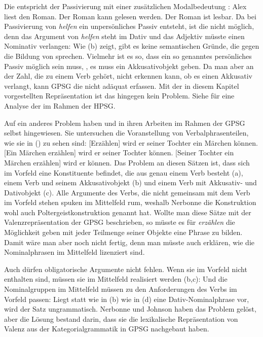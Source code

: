 Die \bard entspricht der Passivierung mit einer zusätzlichen Modalbedeutung \citep[233]{Gelhaus77}:
\eal
\ex Alex liest den Roman.
\ex Der Roman kann gelesen werden.
\ex Der Roman ist lesbar.
\zl
Da bei Passivierung von \emph{helfen} ein unpersönliches Passiv entsteht, ist die \bard nicht
möglich, denn das Argument von \emph{helfen} steht im Dativ und das Adjektiv müsste einen Nominativ verlangen:
\eal
{}
\zl
Wie (b) zeigt, gibt es keine semantischen Gründe, die gegen die Bildung von 
sprechen. Vielmehr ist es so, dass ein so genanntes persönliches Passiv möglich sein muss, \dash, es
muss ein Akkusativobjekt geben. Da man aber an der Zahl, die zu einem Verb gehört, nicht erkennen
kann, ob es einen Akkusativ verlangt, kann GPSG die \bard nicht adäquat erfassen. Mit der in diesem
Kapitel vorgestellten Repräsentation ist das hingegen kein Problem. Siehe \zb \citet{Riehemann97a}
für eine Analyse der \bard im Rahmen der HPSG.


Auf ein anderes Problem haben \citet{Nerbonne86a} und \citet{Johnson86a} in ihren Arbeiten im Rahmen
der GPSG selbst hingewiesen. Sie untersuchen die Voranstellung von
Verbalphrasenteilen, wie sie in () zu sehen sind:
\eal
\ex {}[Erzählen] wird er seiner Tochter ein Märchen können.
\ex {}[Ein Märchen erzählen] wird er seiner Tochter können.
\ex {}[Seiner Tochter ein Märchen erzählen] wird er können.
\zl
Das Problem an diesen Sätzen ist, dass sich im Vorfeld eine Konstituente befindet, die aus genau
einem Verb besteht (a), einem Verb und seinem Akkusativobjekt (b) und einem Verb mit
Akkusativ- und Dativobjekt (c). Alle Argumente des Verbs, die nicht gemeinsam mit dem Verb im
Vorfeld stehen spuken im Mittelfeld rum, weshalb Nerbonne die Konstruktion wohl auch
Poltergeistkonstruktion genannt hat. Wollte man diese Sätze mit der Valenzrepräsentation der GPSG
beschrieben, so müsste es für \emph{erzählen} die Möglichkeit geben mit jeder Teilmenge seiner
Objekte eine Phrase zu bilden. Damit wäre man aber noch nicht fertig, denn man müsste auch erklären,
wie die Nominalphrasen im Mittelfeld lizenziert sind.

Auch dürfen obligatorische Argumente nicht fehlen. Wenn sie im Vorfeld nicht enthalten sind, müssen
sie im Mittelfeld realisiert werden (b,c):
\eal
{}
\zl
Und die Nominalgruppen im Mittelfeld müssen zu den Anforderungen des Verbs im Vorfeld
passen: Liegt statt wie in (b) wie in (d) eine Dativ-Nominalphrase vor, wird der Satz
ungrammatisch. Nerbonne und Johnson haben das Problem gelöst, aber die Lösung bestand darin, dass
sie die lexikalische Repräsentation von Valenz aus der Kategorialgrammatik in GPSG nachgebaut haben.

